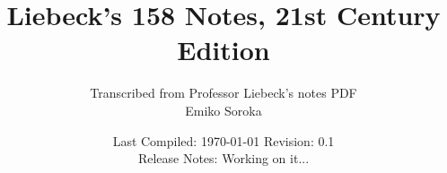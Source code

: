 \documentclass[draft=false, titlepage]{article}
\title{Liebeck's 158 Notes, 21st Century Edition}
\author{Transcribed from Professor Liebeck's notes PDF\\
	\small Emiko Soroka}
\date{Last Compiled: \today\linebreak\linebreak
	\small Revision: 0.1\\
	Release Notes: Working on it...}
\begin{document}
\maketitle
\tableofcontents
\listoffigures
\listoftables
\pagebreak

	
\end{document}
